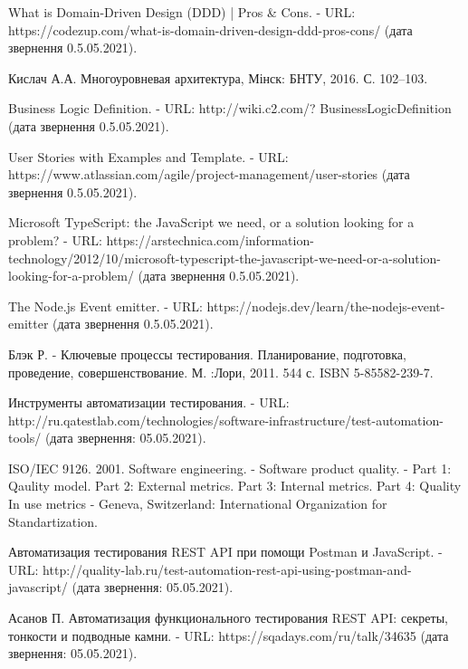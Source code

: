 \begin{thebibliography}{00}
			What is Domain-Driven Design (DDD) | Pros \& Cons. -
			URL: https://codezup.com/what-is-domain-driven-design-ddd-pros-cons/
			(дата звернення 0.5.05.2021).
	
			Кислач А.А.
			Многоуровневая архитектура,
			Мінск: БНТУ, 2016. С. 102–103.
	
			Business Logic Definition. -
			URL: http://wiki.c2.com/?
      BusinessLogicDefinition (дата звернення 0.5.05.2021).
	
			User Stories with Examples and Template. -
			URL: https://www.atlassian.com/agile/project-management/user-stories
			(дата звернення 0.5.05.2021).

      Microsoft TypeScript: the JavaScript we need, or a solution looking for a problem? -
      URL: https://arstechnica.com/information-technology/2012/10/microsoft-typescript-the-javascript-we-need-or-a-solution-looking-for-a-problem/
			(дата звернення 0.5.05.2021).

      The Node.js Event emitter. -
      URL: https://nodejs.dev/learn/the-nodejs-event-emitter
			(дата звернення 0.5.05.2021).

      Блэк Р. -
      Ключевые процессы тестирования.
      Планирование, подготовка, проведение, совершенствование. М. :Лори,
      2011. 544 с. ISBN 5-85582-239-7.

      Инструменты автоматизации тестирования. -
      URL: http://ru.qatestlab.com/technologies/software-infrastructure/test-automation-tools/
      (дата звернення: 05.05.2021).

      ISO/IEC 9126. 2001. Software engineering. -
      Software product quality. -
      Part 1: Qaulity model. 
      Part 2: External metrics. 
      Part 3: Internal metrics. 
      Part 4: Quality In use metrics -
      Geneva, Switzerland: International Organization for Standartization.

      Автоматизация тестирования REST API при помощи Postman и JavaScript. -
      URL: http://quality-lab.ru/test-automation-rest-api-using-postman-and-javascript/
      (дата звернення: 05.05.2021).

      Асанов П.
      Автоматизация функционального тестирования REST API:
      секреты, тонкости и подводные камни. -
      URL: https://sqadays.com/ru/talk/34635
      (дата звернення: 05.05.2021).

\end{thebibliography}
\endgroup

\clearpage
